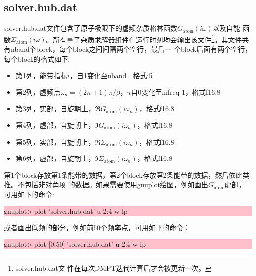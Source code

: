 \subsection{solver.hub.dat}
solver.hub.dat文件包含了原子极限下的虚频杂质格林函数$G_{\text{atom}}(i\omega)$以及自能
函数$\Sigma_{\text{atom}}(i\omega)$。所有量子杂质求解器组件在运行时刻均会输出该文件\footnote{solver.hub.dat文
件在每次DMFT迭代计算后才会被更新一次。}。其文件共有nband个block，每个block之间间隔两个空行，最后一
个block后面有两个空行，每个block的格式如下:
\begin{itemize}
\item 第1列，能带指标$i$，自1变化至nband，格式i5
\item 第2列，虚频点$\omega_{n}=(2n+1)\pi/\beta$，$n$自0变化至mfreq-1，格式f16.8
\item 第3列，实部，自旋朝上，$\Re G_{\text{atom}}(i\omega_{n})$，格式f16.8
\item 第4列，虚部，自旋朝上，$\Im G_{\text{atom}}(i\omega_{n})$，格式f16.8
\item 第5列，实部，自旋朝上，$\Re \Sigma_{\text{atom}}(i\omega_{n})$，格式f16.8
\item 第6列，虚部，自旋朝上，$\Im \Sigma_{\text{atom}}(i\omega_{n})$，格式f16.8
\end{itemize}
第1个block存放第1条能带的数据，第2个block存放第2条能带的数据，然后依此类推。不包括非对角项
的数据。如果需要使用gnuplot绘图，例如画出$G_{\text{atom}}$虚部，可用如下的命令:

\noindent\colorbox{pink}{\parbox[r]{\linewidth}{\quad gnuplot> plot 'solver.hub.dat' u 2:4 w lp }}
或者画出低频的部分，例如前50个频率点，可用如下的命令：

\noindent\colorbox{pink}{\parbox[r]{\linewidth}{\quad gnuplot> plot [0:50] 'solver.hub.dat' u 2:4 w lp }}


